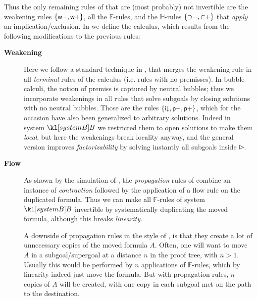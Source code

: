 Thus the only remaining rules of  that are (most probably) not
invertible are the weakening rules $\{\text{\small$\mathsf{w{-}}$},\text{\small$\mathsf{w{+}}$}\}$, all the
$\mathbb{F}$-rules, and the $\mathbb{H}$-rules $\{\text{\small$\mathsf{{\supset}{-}}$},
\text{\small$\mathsf{{\subset}{+}}$}\}$ that \emph{apply} an implication/exclusion.
In  we define the  calculus, which results
from the following modifications to the previous rules:
\begin{description}
  \item[\textbf{Weakening}]
    Here we follow a standard technique in , that merges the
    weakening rule in all \emph{terminal} rules of the calculus (i.e. rules with
    no premisses). In bubble calculi, the notion of premiss is captured by
    neutral bubbles; thus we incorporate weakenings in all rules that solve
    subgoals by closing solutions with no neutral bubbles. Those are the rules
    $\{\text{\small$\mathsf{i{\downarrow}}$},\text{\small$\mathsf{p{-}}$},\text{\small$\mathsf{p{+}}$}\}$, which for the occasion have
    also been generalized to arbitrary solutions. Indeed in system $\sysB$ we
    restricted them to open solutions to make them \emph{local}, but here the
    weakenings break locality anyway, and the general version improves
    \emph{factorizability} by solving instantly all subgoals inside $\mathbin{\rhd}$.

  \item[\textbf{Flow}]
    As shown by the simulation of , the
    \emph{propagation} rules of  combine an instance of
    \emph{contraction} followed by the application of a flow rule on the
    duplicated formula. Thus we can make all $\mathbb{F}$-rules of system
    $\sysB$ invertible by systematically duplicating the moved formula, although
    this breaks \emph{linearity}.

    A downside of propagation rules in the style of , is that they
    create a lot of unnecessary copies of the moved formula $A$. Often, one will
    want to move $A$ in a subgoal/supergoal at a distance $n$ in the proof tree,
    with $n > 1$. Usually this would be performed by $n$ applications of
    $\mathbb{F}$-rules, which by linearity indeed just move the formula. But with
    propagation rules, $n$ copies of $A$ will be created, with one copy in each
    subgoal met on the path to the destination.


\end{description}
